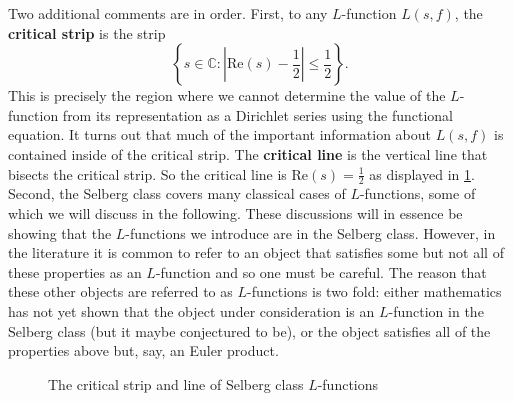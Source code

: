 \documentclass[12pt]{book}
\theoremstyle{definition}\newframedtheorem{method}{Method}
\newcommand{\C}{\mathbb{C}}
\newcommand{\<}{\langle}
\renewcommand{\>}{\rangle}
\renewcommand{\Re}{\mathrm{Re}}
\begin{document}
      Two additional comments are in order. First, to any $L$-function $L(s,f)$, the \textbf{critical strip} is the strip
      \[
        \left\{s \in \C:\left|\Re(s)-\frac{1}{2}\right| \le \frac{1}{2}\right\}.
      \]
      This is precisely the region where we cannot determine the value of the $L$-function from its representation as a Dirichlet series using the functional equation. It turns out that much of the important information about $L(s,f)$ is contained inside of the critical strip. The \textbf{critical line} is the vertical line that bisects the critical strip. So the critical line is $\Re(s) = \frac{1}{2}$ as displayed in \cref{fig:critical_strip}. Second, the Selberg class covers many classical cases of $L$-functions, some of which we will discuss in the following. These discussions will in essence be showing that the $L$-functions we introduce are in the Selberg class. However, in the literature it is common to refer to an object that satisfies some but not all of these properties as an $L$-function and so one must be careful. The reason that these other objects are referred to as $L$-functions is two fold: either mathematics has not yet shown that the object under consideration is an $L$-function in the Selberg class (but it maybe conjectured to be), or the object satisfies all of the properties above but, say, an Euler product.

      \begin{figure}[ht]
        \centering
        \caption{The critical strip and line of Selberg class $L$-functions}
        \label{fig:critical_strip}
      \end{figure}
\end{document}
